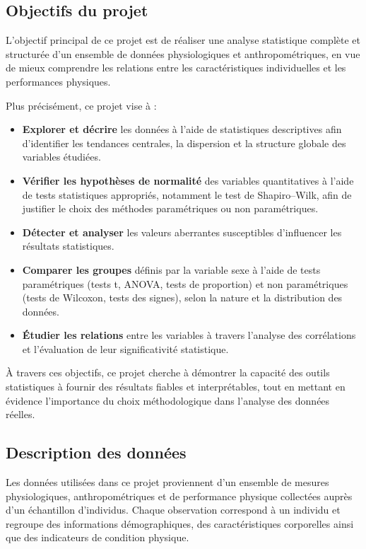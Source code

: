 \documentclass[
]{article}
\providecommand{\tightlist}{%
  \setlength{\itemsep}{0pt}\setlength{\parskip}{0pt}}
\begin{document}
\subsection{Objectifs du projet}\label{objectifs-du-projet}

L'objectif principal de ce projet est de réaliser une analyse
statistique complète et structurée d'un ensemble de données
physiologiques et anthropométriques, en vue de mieux comprendre les
relations entre les caractéristiques individuelles et les performances
physiques.

Plus précisément, ce projet vise à :

\begin{itemize}
\tightlist
\item
  \textbf{Explorer et décrire} les données à l'aide de statistiques
  descriptives afin d'identifier les tendances centrales, la dispersion
  et la structure globale des variables étudiées.
\item
  \textbf{Vérifier les hypothèses de normalité} des variables
  quantitatives à l'aide de tests statistiques appropriés, notamment le
  test de Shapiro--Wilk, afin de justifier le choix des méthodes
  paramétriques ou non paramétriques.
\item
  \textbf{Détecter et analyser} les valeurs aberrantes susceptibles
  d'influencer les résultats statistiques.
\item
  \textbf{Comparer les groupes} définis par la variable sexe à l'aide de
  tests paramétriques (tests t, ANOVA, tests de proportion) et non
  paramétriques (tests de Wilcoxon, tests des signes), selon la nature
  et la distribution des données.
\item
  \textbf{Étudier les relations} entre les variables à travers l'analyse
  des corrélations et l'évaluation de leur significativité statistique.
\end{itemize}

À travers ces objectifs, ce projet cherche à démontrer la capacité des
outils statistiques à fournir des résultats fiables et interprétables,
tout en mettant en évidence l'importance du choix méthodologique dans
l'analyse des données réelles.

\subsection{Description des données}\label{description-des-donnuxe9es}

Les données utilisées dans ce projet proviennent d'un ensemble de
mesures physiologiques, anthropométriques et de performance physique
collectées auprès d'un échantillon d'individus. Chaque observation
correspond à un individu et regroupe des informations démographiques,
des caractéristiques corporelles ainsi que des indicateurs de condition
physique.
\end{document}
